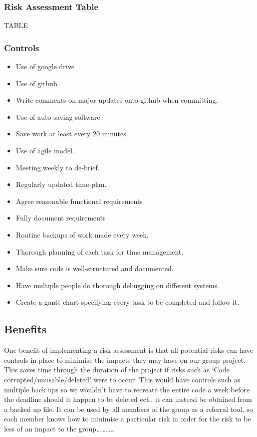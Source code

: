 \documentclass[12pt]{article}
\begin{document}
     
     \subsubsection{Risk Assessment Table}
     
     TABLE
     
     \subsubsection{Controls}
    \begin{itemize}
    
\item Use of google drive
\item Use of github
\item Write comments on major updates onto github when committing.
\item Use of auto-saving software
\item Save work at least every 20 minutes.
\item Use of agile model.
\item Meeting weekly to de-brief.
\item Regularly updated time-plan.
\item Agree reasonable functional requirements
\item Fully document requirements
\item Routine backups of work made every week.
\item Thorough planning of each task for time management.
\item Make sure code is well-structured and documented.
\item Have multiple people do thorough debugging on different systems.
\item Create a gantt chart specifying every task to be completed and follow it. 
\end{itemize}

\subsection{Benefits}

One benefit of implementing a risk assessment is that all potential risks can have controls in place to minimise the impacts they may have on our group project. This saves time through the duration of the project if risks such as ‘Code corrupted/unusable/deleted’ were to occur. This would have controls such as multiple back ups so we wouldn’t have to recreate the entire code a week before the deadline should it happen to be deleted ect., it can instead be obtained from a backed up file.  It can be used by all members of the group as a referral tool, so each member knows how to minimise a particular risk in order for the risk to be less of an impact to the group………… 
\end{document}
